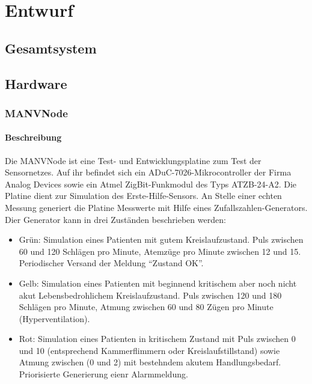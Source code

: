 

\chapter{Entwurf}

\section{Gesamtsystem}

\section{Hardware}
\subsection{MANVNode}

\subsubsection{Beschreibung}
Die MANVNode ist eine Test- und Entwicklungsplatine zum Test der Sensornetzes. Auf ihr befindet sich ein ADuC-7026-Mikrocontroller
der Firma Analog Devices sowie ein Atmel ZigBit-Funkmodul des Typs ATZB-24-A2. Die Platine dient zur Simulation 
des Erste-Hilfe-Sensors. An Stelle einer echten Messung generiert die Platine Messwerte mit Hilfe eines Zufallszahlen-Generators.
Dier Generator kann in drei Zuständen beschrieben werden:

\begin{itemize}
    \item{Grün:} Simulation eines Patienten mit gutem Kreislaufzustand. Puls zwischen 60 und 120 Schlägen pro Minute, 
                 Atemzüge pro Minute zwischen 12 und 15. Periodischer Versand der Meldung "`Zustand OK"'.
    \item{Gelb:} Simulation eines Patienten mit beginnend kritischem aber noch nicht akut Lebensbedrohlichem 
                 Kreislaufzustand. Puls zwischen 120 und 180 Schlägen pro Minute, Atmung zwischen 60 und 80
                 Zügen pro Minute (Hyperventilation).
    \item{Rot:}  Simulation eines Patienten in kritischem Zustand mit Puls zwischen 0 und 10 (entsprechend
                 Kammerflimmern oder Kreislaufstillstand) sowie Atmung zwischen (0 und 2) mit bestehndem
                 akutem Handlungsbedarf. Priorisierte Generierung eienr Alarmmeldung.
\end{itemize}

